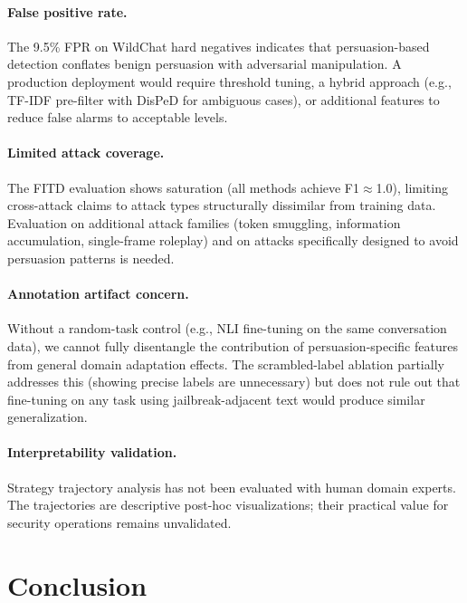 \documentclass[11pt,a4paper]{article}
\newcommand{\ours}{DisPeD}
\begin{document}
\paragraph{False positive rate.}
The 9.5\% FPR on WildChat hard negatives indicates that persuasion-based detection conflates benign persuasion with adversarial manipulation. A production deployment would require threshold tuning, a hybrid approach (e.g., TF-IDF pre-filter with \ours{} for ambiguous cases), or additional features to reduce false alarms to acceptable levels.

\paragraph{Limited attack coverage.}
The FITD evaluation shows saturation (all methods achieve F1$\approx$1.0), limiting cross-attack claims to attack types structurally dissimilar from training data. Evaluation on additional attack families (token smuggling, information accumulation, single-frame roleplay) and on attacks specifically designed to avoid persuasion patterns is needed.

\paragraph{Annotation artifact concern.}
Without a random-task control (e.g., NLI fine-tuning on the same conversation data), we cannot fully disentangle the contribution of persuasion-specific features from general domain adaptation effects. The scrambled-label ablation partially addresses this (showing precise labels are unnecessary) but does not rule out that fine-tuning on any task using jailbreak-adjacent text would produce similar generalization.

\paragraph{Interpretability validation.}
Strategy trajectory analysis has not been evaluated with human domain experts. The trajectories are descriptive post-hoc visualizations; their practical value for security operations remains unvalidated.


\section{Conclusion}
\end{document}
